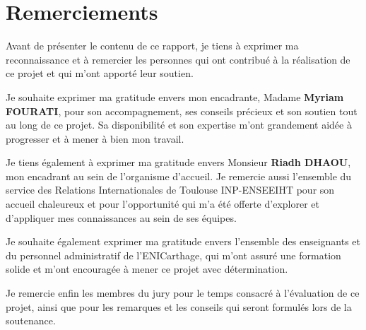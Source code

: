 \chapter*{Remerciements}
{}
\begin{flushleft}
    \begin{justify}
Avant de présenter le contenu de ce rapport, je tiens à exprimer ma reconnaissance et à remercier les personnes qui ont contribué à la réalisation de ce projet et qui m'ont apporté leur soutien. \\
       \end{justify}
\end{flushleft}

\begin{flushleft}
    \begin{justify}

Je souhaite exprimer ma gratitude envers mon encadrante, Madame \textbf{Myriam FOURATI}, pour son accompagnement, ses conseils précieux et son soutien tout au long de ce projet. Sa disponibilité et son expertise m'ont grandement aidée à progresser et à mener à bien mon travail. \\
       \end{justify}
\end{flushleft}

\begin{flushleft}
    \begin{justify}

Je tiens également à exprimer ma gratitude envers Monsieur \textbf{Riadh DHAOU}, mon encadrant au sein de l'organisme d'accueil. Je remercie aussi l'ensemble du service des Relations Internationales de Toulouse INP-ENSEEIHT pour son accueil chaleureux et pour l'opportunité qui m'a été offerte d'explorer et d'appliquer mes connaissances au sein de ses équipes.
       \end{justify}
\end{flushleft}

\begin{flushleft}
    \begin{justify}
Je souhaite également exprimer ma gratitude envers l'ensemble des enseignants et du personnel administratif de l'ENICarthage, qui m'ont assuré une formation solide et m'ont encouragée à mener ce projet avec détermination. \\
       \end{justify}
\end{flushleft}

\begin{flushleft}
    \begin{justify}
Je remercie enfin les membres du jury pour le temps consacré à l'évaluation de ce projet, ainsi que pour les remarques et les conseils qui seront formulés lors de la soutenance.

       \end{justify}
\end{flushleft}
